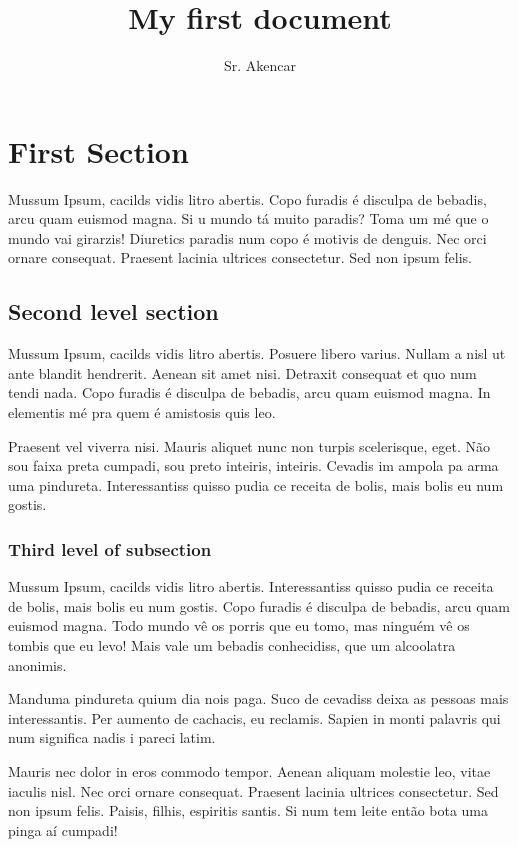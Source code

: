 \documentclass{article}
\title{My first document}
\author{Sr. Akencar}
\date{}
\begin{document}
\maketitle

\section{First Section}

Mussum Ipsum, cacilds vidis litro abertis. Copo furadis é disculpa de bebadis, arcu quam euismod magna. Si u mundo tá muito paradis? Toma um mé que o mundo vai girarzis! Diuretics paradis num copo é motivis de denguis. Nec orci ornare consequat. Praesent lacinia ultrices consectetur. Sed non ipsum felis.


\subsection{Second level section}

Mussum Ipsum, cacilds vidis litro abertis. Posuere libero varius. Nullam a nisl ut ante blandit hendrerit. Aenean sit amet nisi. Detraxit consequat et quo num tendi nada. Copo furadis é disculpa de bebadis, arcu quam euismod magna. In elementis mé pra quem é amistosis quis leo.

Praesent vel viverra nisi. Mauris aliquet nunc non turpis scelerisque, eget. Não sou faixa preta cumpadi, sou preto inteiris, inteiris. Cevadis im ampola pa arma uma pindureta. Interessantiss quisso pudia ce receita de bolis, mais bolis eu num gostis.

\subsubsection{Third level of subsection}

Mussum Ipsum, cacilds vidis litro abertis. Interessantiss quisso pudia ce receita de bolis, mais bolis eu num gostis. Copo furadis é disculpa de bebadis, arcu quam euismod magna. Todo mundo vê os porris que eu tomo, mas ninguém vê os tombis que eu levo! Mais vale um bebadis conhecidiss, que um alcoolatra anonimis.

Manduma pindureta quium dia nois paga. Suco de cevadiss deixa as pessoas mais interessantis. Per aumento de cachacis, eu reclamis. Sapien in monti palavris qui num significa nadis i pareci latim.

Mauris nec dolor in eros commodo tempor. Aenean aliquam molestie leo, vitae iaculis nisl. Nec orci ornare consequat. Praesent lacinia ultrices consectetur. Sed non ipsum felis. Paisis, filhis, espiritis santis. Si num tem leite então bota uma pinga aí cumpadi!
\end{document}
